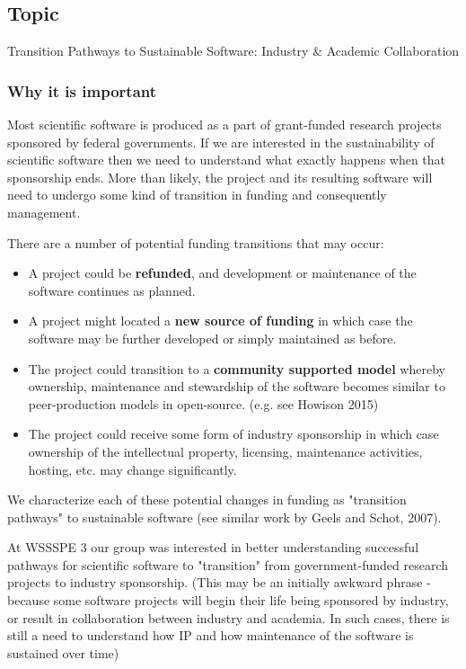 \subsection{Topic} 

Transition Pathways to Sustainable Software: Industry \& Academic Collaboration

\subsubsection{Why it is important}

Most scientific software is produced as a part of grant-funded research projects sponsored by federal governments. If we are interested in the sustainability of scientific software then we need to understand what exactly happens when that sponsorship ends. More than likely, the project and its resulting software will need to undergo some kind of transition in funding and consequently management. 

There are a number of potential funding transitions that may occur:  

\begin{itemize}
\item A project could be \textbf{refunded}, and development or maintenance of the software continues as planned.
\item A project might located a \textbf{new source of funding} in which case the software may be further developed or simply maintained as before. 
\item The project could transition to a \textbf{community supported model} whereby ownership, maintenance and stewardship of the software becomes similar to peer-production models in open-source. (e.g. see Howison 2015)
\item The project could receive some form of industry sponsorship in which case ownership of the intellectual property, licensing, maintenance activities, hosting, etc. may change significantly. 
\end{itemize}

We characterize each of these potential changes in funding as "transition pathways" to sustainable software (see similar work by Geels and Schot, 2007). 

At WSSSPE 3 our group was interested in better understanding successful pathways for scientific software to "transition" from government-funded research projects to industry sponsorship. (This may be an initially awkward phrase - because some software projects will begin their life being sponsored by industry, or result in collaboration between industry and academia. In such cases, there is still a need to understand how IP and how maintenance of the software is sustained over time)

